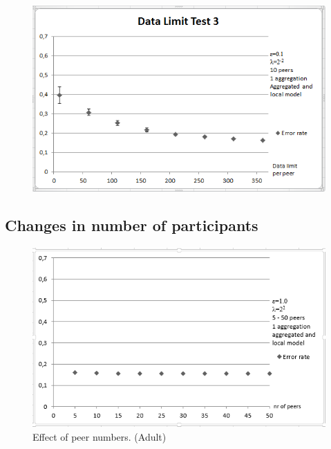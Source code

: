 \begin{figure}[H]
	\hspace{1mm}
	\begin{minipage}{.65\linewidth}
		\includegraphics[width=\linewidth]{fig/spambase/data_limit_test_localmodelonly}
		\label{fig:data_limit_test_localmodelonly}
	\end{minipage}
\end{figure}


\subsection{Changes in number of participants}
\begin{figure}[H]
	\centering
	\includegraphics[width=\textwidth]{fig/adult/peer_range_constant_group}
	\caption{Effect of peer numbers. (Adult)}
	\label{fig:peer_range_constant_group}
\end{figure}



